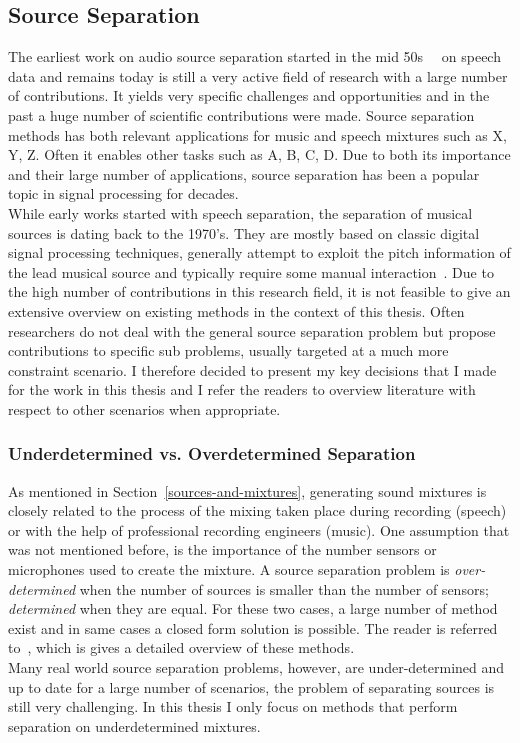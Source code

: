 \subsection{Source Separation}
The earliest work on audio source separation started in the mid 50s~~\cite{} on speech data and remains today is still a very active field of research with a large number of contributions.
It yields very specific challenges and opportunities and in the past a huge number of scientific contributions were made.
Source separation methods has both relevant applications for music and speech mixtures such as X, Y, Z. Often it enables other tasks such as A, B, C, D.
Due to both its importance and their large number of applications, source separation has been a popular topic in signal processing for decades.\\
While early works started with speech separation, the separation of musical sources is dating back to the 1970's.
They are mostly based on classic digital signal processing techniques, generally attempt to exploit the pitch information of the lead musical source and typically require some manual interaction~\cite{miller73, oppenheim68, oppenheim682}.
Due to the high number of contributions in this research field, it is not feasible to give an extensive overview on existing methods in the context of this thesis.
Often researchers do not deal with the general source separation problem but propose contributions to specific sub problems, usually targeted at a much more constraint scenario.
I therefore decided to present my key decisions that I made for the work in this thesis and I refer the readers to overview literature with respect to other scenarios when appropriate.

\subsubsection{Underdetermined vs. Overdetermined Separation}
As mentioned in Section~\ref{sources-and-mixtures}, generating sound mixtures is closely related to the process of the mixing taken place during recording (speech) or with the help of professional recording engineers (music).
One assumption that was not mentioned before, is the importance of the number sensors or microphones used to create the mixture.
A source separation problem is \emph{over-determined} when the number of sources is smaller than the number of sensors; \emph{determined} when they are equal.
For these two cases, a large number of method exist and in same cases a closed form solution is possible.
The reader is referred to~\cite{common10}, which is gives a detailed overview of these methods.\\
Many real world source separation problems, however, are under-determined and up to date for a large number of scenarios, the problem of separating sources is still very challenging.
In this thesis I only focus on methods that perform separation on underdetermined mixtures.

